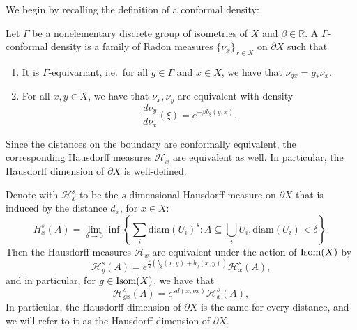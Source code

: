 \documentclass{report}
\begin{document}
We begin by recalling the definition of a conformal density:
\begin{definition}
    Let $\Gamma$ be a nonelementary discrete group of isometries of $X$ and $\beta \in \mathbb R$.
    A $\Gamma$-conformal density is a family of Radon measures $\{\nu_x\}_{x \in X}$ on $\partial X $ such that
    \begin{enumerate}[label=(\roman*)]
        \item It is $\Gamma$-equivariant, i.e.\ for all $g \in \Gamma$ and $x \in X$, we have that $\nu_{gx} = g_* \nu_x$.
        \item For all $x, y \in X$, we have that $\nu_x, \nu_y$ are equivalent with density
        \[
        \frac{d\nu_y}{d\nu_x}(\xi) = e^{-\beta b_\xi(y,x)}.
        \]
    \end{enumerate}
\end{definition}
Since the distances on the boundary are conformally equivalent, the corresponding Hausdorff measures $\mathcal H_x$ are equivalent as well.
In particular, the Hausdorff dimension of $\partial X$ is well-defined.
\begin{lemma}
    Denote with $\mathcal H^s_x$ to be the $s$-dimensional Hausdorff measure on $\partial X$ that is induced by the distance $d_x$, for $x \in X$:
    \[
    H^s_x(A) = \lim_{\delta \to 0} \inf \left\{ \sum_i \mathrm{diam}(U_i)^s : A \subseteq \bigcup_i U_i, \mathrm{diam}(U_i) < \delta \right\}.
    \]
    Then the Hausdorff measures $\mathcal H_x$ are equivalent under the action of $\operatorname{Isom}(X)$ by
    \[
    \mathcal H^s_y (A) = e^{\frac{s}{2} \left( b_\xi(x,y) + b_\eta(x,y) \right)} \mathcal H^s_x(A),
    \]
    and in particular, for $g \in \operatorname{Isom}(X)$, we have that
    \[
    \mathcal H^s_{gx} (A) = e^{s d(x, gx)} \mathcal H^s_x(A), 
    \]
    In particular, the Hausdorff dimension of $\partial X$ is the same for every distance, and we will refer to it as the Hausdorff dimension of $\partial X$.
\end{lemma}
\end{document}
